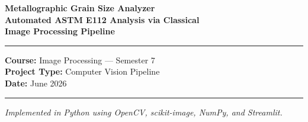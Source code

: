 \documentclass[12pt,a4paper]{article}
\begin{document}
\begin{titlepage}
    \centering
    \vspace*{2cm}

    {\Huge\bfseries\color{blue!70!black}
        Metallographic Grain Size Analyzer\\[0.4em]
        \large\color{black}Automated ASTM E112 Analysis via Classical\\
        Image Processing Pipeline
    }

    \vspace{1.5cm}
    \rule{\linewidth}{1.5pt}
    \vspace{0.5cm}

    {\large
        \textbf{Course:} Image Processing --- Semester 7\\[0.3em]
        \textbf{Project Type:} Computer Vision Pipeline\\[0.3em]
        \textbf{Date:} June 2026
    }

    \vspace{1cm}
    \rule{\linewidth}{0.5pt}
    \vspace{1.5cm}

    \begin{abstract}
        \noindent
        This report presents an automated five-stage image processing pipeline for
        metallographic grain size analysis compliant with the ASTM E112 standard.
        The system processes optical microscope images of polished metallic specimens,
        detects grain boundaries using a multi-method binarization strategy, extracts
        a topological skeleton, segments individual grains via watershed algorithm, and
        computes the ASTM grain size number~$G$ using the intercept method with
        topological junction weighting. Evaluated across 15 annotated images,
        the pipeline achieves an average F1 score of \textbf{0.658} for boundary detection
        and reports an average ASTM grain size number of \textbf{$G = 8.81$},
        corresponding to a mean intercept length of approximately 14.7~\textmu m.
        The system is implemented in Python with OpenCV and scikit-image, and
        includes a configurable parameter file and a Streamlit web interface.
    \end{abstract}

    \vfill
    {\small\textit{Implemented in Python using OpenCV, scikit-image, NumPy, and Streamlit.}}
\end{titlepage}
\end{document}
